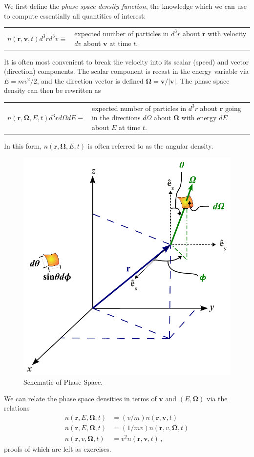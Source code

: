 We first define the \textit{phase space density function}, the knowledge which we can use to compute essentially all quantities of interest:
\begin{center}
  \begin{tabular}{cp{7.0cm}}
    $n(\mathbf{r},\mathbf{v},t)d^3r d^3v \equiv $ &
    expected number of particles in  $d^3r$  about  $\mathbf{r}$  with velocity  $dv$ about  $\mathbf{v}$ at time $t$.  
  \end{tabular}
\end{center}
It is often most convenient to break the velocity into its scalar (speed) and vector (direction) components.  The scalar component is recast in the energy variable via $E = mv^2/2$, and the direction vector is defined $\mathbf{\Omega}=\mathbf{v}/|\mathbf{v}|$.  The phase space density can then be rewritten as
\begin{center}
  \begin{tabular}{cp{7.0cm}}
    $n(\mathbf{r},\mathbf{\Omega},E,t)d^3r d\Omega dE \equiv $ &
    expected number of particles in  $d^3r$  about  $\mathbf{r}$  going in the directions $d\Omega$ about $\mathbf{\Omega}$ with energy  $dE$ about  $E$ at time $t$.  
  \end{tabular}
\end{center}
In this form, $n(\mathbf{r},\mathbf{\Omega},E,t)$ is often referred to as the angular density.

\begin{figure}
    \begin{center}
    \includegraphics[keepaspectratio, width = 2.7 in]{phase_space}
    \end{center}
    \caption{Schematic of Phase Space.}
    \label{fig:phase_space}
\end{figure}

We can relate the phase space densities in terms of $\mathbf{v}$ and $(E,\mathbf{\Omega})$ via the relations
\begin{equation}
 \begin{split}
  n(\mathbf{r},E,\mathbf{\Omega},t) &= (v/m) n(\mathbf{r},\mathbf{v},t) \\
  n(\mathbf{r},E,\mathbf{\Omega},t) &= (1/mv) n(\mathbf{r},v,\mathbf{\Omega},t) \\
  n(\mathbf{r},v,\mathbf{\Omega},t) &= v^2 n(\mathbf{r},\mathbf{v},t) \, ,
 \end{split}
 \label{eq:densityrelations}
\end{equation}
proofs of which are left as exercises.

